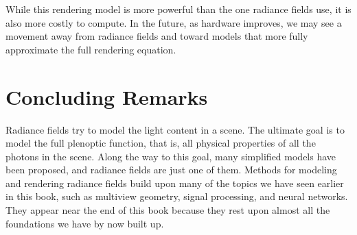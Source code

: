 While this rendering model is more powerful than the one radiance fields use, it is also more costly to compute. In the future, as hardware improves, we may see a movement away from radiance fields and toward models that more fully approximate the full rendering equation.


\section{Concluding Remarks}

Radiance fields try to model the light content in a scene. The ultimate goal is to model the full plenoptic function, that is, all physical properties of all the photons in the scene. Along the way to this goal, many simplified models have been proposed, and radiance fields are just one of them. Methods for modeling and rendering radiance fields build upon many of the topics we have seen earlier in this book, such as multiview geometry, signal processing, and neural networks. They appear near the end of this book because they rest upon almost all the foundations we have by now built up.



